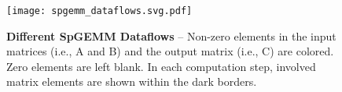 \begin{figure}[tp]
    \centering
    \texttt{[image: spgemm\_dataflows.svg.pdf]}
    \caption[Different Sparse GEMM Dataflows]{
      \textbf{Different SpGEMM Dataflows} -- Non-zero elements in the input
      matrices (i.e., A and B) and the output matrix (i.e., C) are colored.
      Zero elements are left blank. In each computation step, involved matrix
      elements are shown within the dark borders.
    }
    \label{fig-spz-spgemm-dataflows}
\end{figure}
